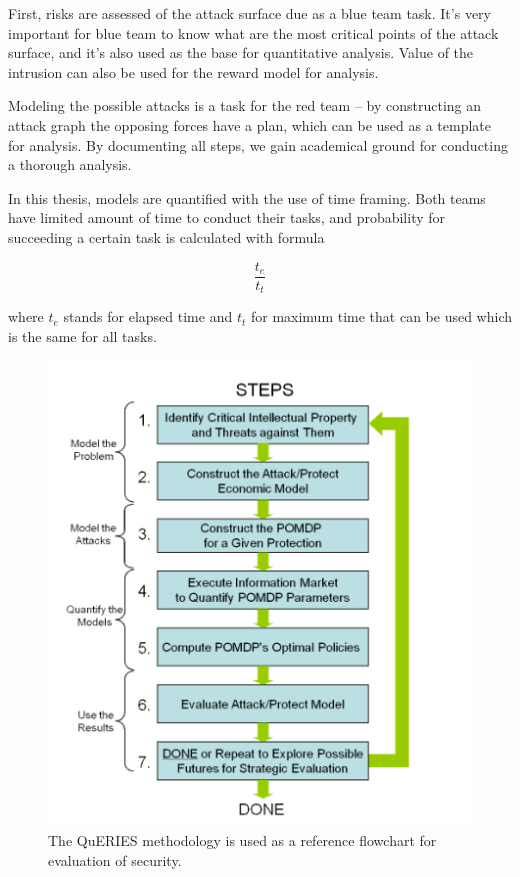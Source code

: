 First, risks are assessed of the attack surface due as a blue team task. It's very important for blue team to know what are the most critical points of the attack surface, and it's also used as the base for quantitative analysis. Value of the intrusion can also be used for the reward model for analysis.

Modeling the possible attacks is a task for the red team – by constructing an attack graph the opposing forces have a plan, which can be used as a template for analysis. By documenting all steps, we gain academical ground for conducting a thorough analysis.

In this thesis, models are quantified with the use of time framing. Both teams have limited amount of time to conduct their tasks, and probability for succeeding a certain task is calculated with formula

\[ \frac{t_e}{t_t} \]

where \(t_e\) stands for elapsed time and \(t_t\) for maximum time that can be used which is the same for all tasks.

\begin{figure}[H]
    \centering
    \includegraphics[scale=0.5]{latex/kuvat/queries.png}
    \caption{The QuERIES methodology is used as a reference flowchart for evaluation of security. \cite{hughes2013quantitative}}
    \label{queriesimg}
\end{figure}

